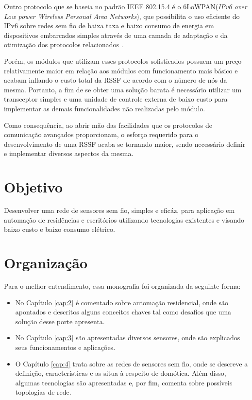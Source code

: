 Outro protocolo que se baseia no padrão IEEE 802.15.4 é o 6LoWPAN(\textit{IPv6 over Low power Wireless
Personal Area Networks}), que possibilita o uso eficiente do IPv6 sobre redes sem fio de baixa taxa e baixo
consumo de energia em dispositivos embarcados simples através de uma camada de adaptação e da otimização dos
protocolos relacionados \cite{shelby_bormann2009}.

Porém, os módulos que utilizam esses protocolos sofisticados possuem um preço relativamente maior em relação
aos módulos com funcionamento mais básico e acabam inflando o custo total da RSSF de acordo com o número de
nós da mesma. Portanto, a fim de se obter uma solução barata é necessário utilizar um transceptor simples e
uma unidade de controle externa de baixo custo para implementar as demais funcionalidades não realizadas pelo
módulo.

Como consequência, ao abrir mão das facilidades que os protocolos de comunicação avançados proporcionam, o
esforço requerido para o desenvolvimento de uma RSSF acaba se tornando maior, sendo necessário definir e
implementar diversos aspectos da mesma.

\section {Objetivo}
Desenvolver uma rede de sensores sem fio, simples e eficáz, para aplicação em automação de residências e
escritórios utilizando tecnologias existentes e visando baixo custo e baixo consumo elétrico.

\section {Organização}
Para o melhor entendimento, essa monografia foi organizada da seguinte forma:

\begin{itemize}
	\item No Capítulo \ref{cap:2} é comentado sobre automação residencial, onde são apontados e descritos
	alguns conceitos chaves tal como desafios que uma solução desse porte apresenta.
	\item No Capítulo \ref{cap:3} são apresentadas diversos sensores, onde são explicados seus
	funcionamentos e aplicações.
	\item O Capítulo \ref{cap:4} trata sobre as redes de sensores sem fio, onde se descreve a definição,
	características e as situa à respeito de domótica. Além disso, algumas tecnologias são apresentadas e,
	por fim, comenta sobre possíveis topologias de rede.
\end{itemize}
